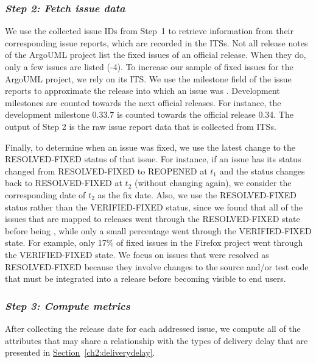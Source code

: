 \subsubsection*{\textbf{\textit{Step 2: Fetch issue data}}}

We use the collected issue IDs from Step~1 to retrieve information from their corresponding
issue reports, which
are recorded in the ITSs. Not all release notes of
the ArgoUML project
list the fixed issues of an official release. When they do,
only a few issues are listed (-4).
To increase our sample of fixed issues for the ArgoUML project, we rely on its
ITS. We use the milestone field of
the issue reports to approximate the release into which an issue was \DIFdelbegin {}\DIFdelend \DIFaddbegin {}\DIFaddend .
Development milestones are counted towards the next official releases. For
instance, the development milestone
0.33.7
is counted towards the official release 0.34. The output of Step 2 is the raw
issue report data that is collected from ITSs.

Finally, to determine when an issue was fixed, we use the latest change to the
RESOLVED-FIXED status of that issue.  For instance, if an issue has its status
changed from RESOLVED-FIXED to REOPENED at $t_1$ and the status changes back to
RESOLVED-FIXED at $t_2$ (without changing again), we consider the corresponding
date of $t_2$ as the fix date. Also, we use the RESOLVED-FIXED status rather
than the VERIFIED-FIXED status, since we found that all of the issues that are
mapped to releases went through the RESOLVED-FIXED state before being \DIFdelbegin {}\DIFdelend \DIFaddbegin {}\DIFaddend , while
only a small percentage went through the VERIFIED-FIXED state. For example, only 17\% of
fixed issues in the Firefox project went through the VERIFIED-FIXED state.
We focus on issues that were resolved as RESOLVED-FIXED because they involve
changes to the source and/or test code that must be integrated into a release
before becoming visible to end users.

\subsubsection*{\textbf{\textit{Step 3: Compute metrics}}} \label{settings:step3}

After collecting the release date for each addressed issue, we compute all of the
attributes that may share a relationship with the types of delivery delay that
are presented in
\hyperref[ch2:deliverydelay]{Section}~\ref{ch2:deliverydelay}.

